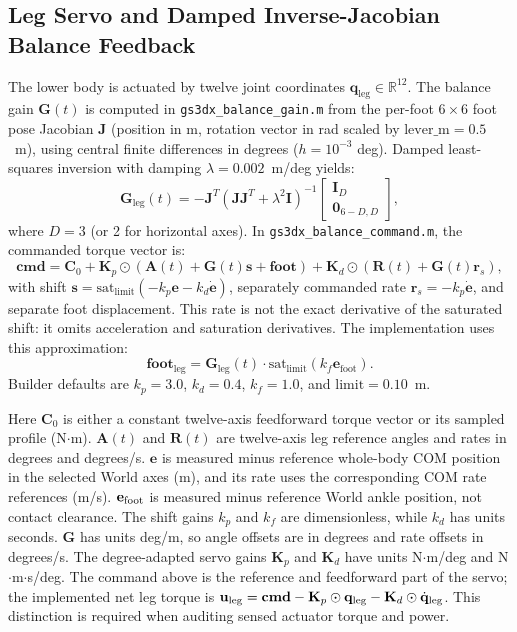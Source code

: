 \documentclass[11pt,a4paper]{article}
\begin{document}
\subsection{Leg Servo and Damped Inverse-Jacobian Balance Feedback}
The lower body is actuated by twelve joint coordinates $\mathbf{q}_{\text{leg}} \in \mathbb{R}^{12}$. The balance gain $\mathbf{G}(t)$ is computed in \texttt{gs3dx\_balance\_gain.m} from the per-foot $6 \times 6$ foot pose Jacobian $\mathbf{J}$ (position in m, rotation vector in rad scaled by $\text{lever\_m} = 0.5$~m), using central finite differences in degrees ($h = 10^{-3}$ deg). Damped least-squares inversion with damping $\lambda = 0.002$~m/deg yields:
\begin{equation}
    \mathbf{G}_{\text{leg}}(t) = -\mathbf{J}^T \left(\mathbf{J} \mathbf{J}^T + \lambda^2 \mathbf{I}\right)^{-1} \begin{bmatrix} \mathbf{I}_D \\ \mathbf{0}_{6-D, D} \end{bmatrix},
\end{equation}
where $D = 3$ (or 2 for horizontal axes). In \texttt{gs3dx\_balance\_command.m}, the commanded torque vector is:
\begin{equation}
    \mathbf{cmd} = \mathbf{C}_0 + \mathbf{K}_p \odot \left(\mathbf{A}(t) + \mathbf{G}(t) \mathbf{s} + \mathbf{foot}\right) + \mathbf{K}_d \odot \left(\mathbf{R}(t) + \mathbf{G}(t) \mathbf{r}_s\right),
\end{equation}
with shift $\mathbf{s} = \text{sat}_{\text{limit}}(-k_p \mathbf{e} - k_d \dot{\mathbf{e}})$, separately commanded rate $\mathbf{r}_s = -k_p \dot{\mathbf{e}}$, and separate foot displacement. This rate is not the exact derivative of the saturated shift: it omits acceleration and saturation derivatives. The implementation uses this approximation:
\begin{equation}
    \mathbf{foot}_{\text{leg}} = \mathbf{G}_{\text{leg}}(t) \cdot \text{sat}_{\text{limit}}\left(k_f \mathbf{e}_{\text{foot}}\right).
\end{equation}
Builder defaults are $k_p = 3.0$, $k_d = 0.4$, $k_f = 1.0$, and $\text{limit} = 0.10$~m.

Here $\mathbf{C}_0$ is either a constant twelve-axis feedforward torque
vector or its sampled profile (N$\cdot$m). $\mathbf{A}(t)$ and
$\mathbf{R}(t)$ are twelve-axis leg reference angles and rates in
degrees and degrees/s. $\mathbf{e}$ is measured minus reference
whole-body COM position in the selected World axes (m), and its
rate uses the corresponding COM rate references (m/s).
$\mathbf{e}_{\rm foot}$ is measured minus reference World ankle
position, not contact clearance. The shift gains $k_p$ and $k_f$
are dimensionless, while $k_d$ has units seconds.
$\mathbf{G}$ has units deg/m, so angle offsets are in degrees
and rate offsets in degrees/s. The degree-adapted servo gains
$\mathbf{K}_p$ and $\mathbf{K}_d$ have units N$\cdot$m/deg
and N$\cdot$m$\cdot$s/deg. The command above is the reference
and feedforward part of the servo; the implemented net leg torque is
$\mathbf{u}_{\rm leg}=\mathbf{cmd}-\mathbf{K}_p\odot\mathbf{q}_{\rm leg}-\mathbf{K}_d\odot\dot{\mathbf{q}}_{\rm leg}$.
This distinction is required when auditing sensed actuator torque and power.
\end{document}
